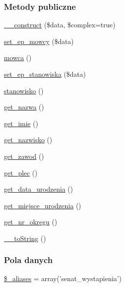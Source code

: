 \subsubsection*{Metody publiczne}
\begin{DoxyCompactItemize}
\item 
\hyperlink{classep___senat___wystapienie_a8c384d5e0f13f64cbf8c51096faa7738}{\-\_\-\-\_\-construct} (\$data, \$complex=true)
\item 
\hyperlink{classep___senat___wystapienie_a394835ac1f34d44b5181f5e2e704deb4}{set\-\_\-ep\-\_\-mowcy} (\$data)
\item 
\hyperlink{classep___senat___wystapienie_a0a281f2a729be7088e24f59b2a897bb6}{mowca} ()
\item 
\hyperlink{classep___senat___wystapienie_a57f2e23f1d143edd2d513c213b5a0f52}{set\-\_\-ep\-\_\-stanowiska} (\$data)
\item 
\hyperlink{classep___senat___wystapienie_a3d84fd752ff96edc69fbe27a52d8d3d7}{stanowisko} ()
\item 
\hyperlink{classep___senat___wystapienie_ac0818f0049d7b84f08f77128f54cee36}{get\-\_\-nazwa} ()
\item 
\hyperlink{classep___senat___wystapienie_ac4b0c85dc2a130038f2d118dbd0c3d77}{get\-\_\-imie} ()
\item 
\hyperlink{classep___senat___wystapienie_abdd1d7ff92508da7f748ba1feec97af0}{get\-\_\-nazwisko} ()
\item 
\hyperlink{classep___senat___wystapienie_af80ca8310b60004454dd02a387deaa2c}{get\-\_\-zawod} ()
\item 
\hyperlink{classep___senat___wystapienie_ac7f9af5c3fa024e4c26a7b6bd4ce4bb4}{get\-\_\-plec} ()
\item 
\hyperlink{classep___senat___wystapienie_a880b240cd2d8c336fd1709bf0cb1ae2c}{get\-\_\-data\-\_\-urodzenia} ()
\item 
\hyperlink{classep___senat___wystapienie_ac57c08ec5e394a19c5bd9280c8376182}{get\-\_\-miejsce\-\_\-urodzenia} ()
\item 
\hyperlink{classep___senat___wystapienie_a2645a9f0aa5b0ccc482943348c033d0a}{get\-\_\-nr\-\_\-okregu} ()
\item 
\hyperlink{classep___senat___wystapienie_a7516ca30af0db3cdbf9a7739b48ce91d}{\-\_\-\-\_\-to\-String} ()
\end{DoxyCompactItemize}
\subsubsection*{Pola danych}
\begin{DoxyCompactItemize}
\item 
\hyperlink{classep___senat___wystapienie_ab4e31d75f0bc5d512456911e5d01366b}{\$\-\_\-aliases} = array('senat\-\_\-wystapienia')
\end{DoxyCompactItemize}
